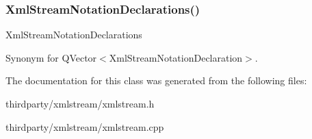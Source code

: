 \subsubsection{\texorpdfstring{Xml\+Stream\+Notation\+Declarations()}{XmlStreamNotationDeclarations()}}
{\footnotesize\ttfamily Xml\+Stream\+Notation\+Declarations\hspace{0.3cm}{\ttfamily [related]}}

Synonym for Q\+Vector$<$\+Xml\+Stream\+Notation\+Declaration$>$. 

The documentation for this class was generated from the following files\+:\begin{DoxyCompactItemize}
\item 
thirdparty/xmlstream/xmlstream.\+h\item 
thirdparty/xmlstream/xmlstream.\+cpp\end{DoxyCompactItemize}
